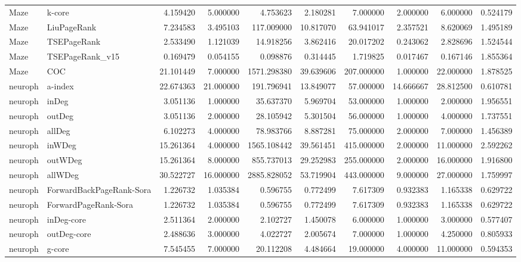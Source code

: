 \begin{tabular}{llrrrrrrrr}
Maze & k-core & 4.159420 & 5.000000 & 4.753623 & 2.180281 & 7.000000 & 2.000000 & 6.000000 & 0.524179 \\
Maze & LiuPageRank & 7.234583 & 3.495103 & 117.009000 & 10.817070 & 63.941017 & 2.357521 & 8.620069 & 1.495189 \\
Maze & TSEPageRank & 2.533490 & 1.121039 & 14.918256 & 3.862416 & 20.017202 & 0.243062 & 2.828696 & 1.524544 \\
Maze & TSEPageRank_v15 & 0.169479 & 0.054155 & 0.098876 & 0.314445 & 1.719825 & 0.017467 & 0.167146 & 1.855364 \\
Maze & COC & 21.101449 & 7.000000 & 1571.298380 & 39.639606 & 207.000000 & 1.000000 & 22.000000 & 1.878525 \\
neuroph & a-index & 22.674363 & 21.000000 & 191.796941 & 13.849077 & 57.000000 & 14.666667 & 28.812500 & 0.610781 \\
neuroph & inDeg & 3.051136 & 1.000000 & 35.637370 & 5.969704 & 53.000000 & 1.000000 & 2.000000 & 1.956551 \\
neuroph & outDeg & 3.051136 & 2.000000 & 28.105942 & 5.301504 & 56.000000 & 1.000000 & 4.000000 & 1.737551 \\
neuroph & allDeg & 6.102273 & 4.000000 & 78.983766 & 8.887281 & 75.000000 & 2.000000 & 7.000000 & 1.456389 \\
neuroph & inWDeg & 15.261364 & 4.000000 & 1565.108442 & 39.561451 & 415.000000 & 2.000000 & 11.000000 & 2.592262 \\
neuroph & outWDeg & 15.261364 & 8.000000 & 855.737013 & 29.252983 & 255.000000 & 2.000000 & 16.000000 & 1.916800 \\
neuroph & allWDeg & 30.522727 & 16.000000 & 2885.828052 & 53.719904 & 443.000000 & 9.000000 & 27.000000 & 1.759997 \\
neuroph & ForwardBackPageRank-Sora & 1.226732 & 1.035384 & 0.596755 & 0.772499 & 7.617309 & 0.932383 & 1.165338 & 0.629722 \\
neuroph & ForwardPageRank-Sora & 1.226732 & 1.035384 & 0.596755 & 0.772499 & 7.617309 & 0.932383 & 1.165338 & 0.629722 \\
neuroph & inDeg-core & 2.511364 & 2.000000 & 2.102727 & 1.450078 & 6.000000 & 1.000000 & 3.000000 & 0.577407 \\
neuroph & outDeg-core & 2.488636 & 3.000000 & 4.022727 & 2.005674 & 7.000000 & 1.000000 & 4.250000 & 0.805933 \\
neuroph & g-core & 7.545455 & 7.000000 & 20.112208 & 4.484664 & 19.000000 & 4.000000 & 11.000000 & 0.594353 \\

\end{tabular}
